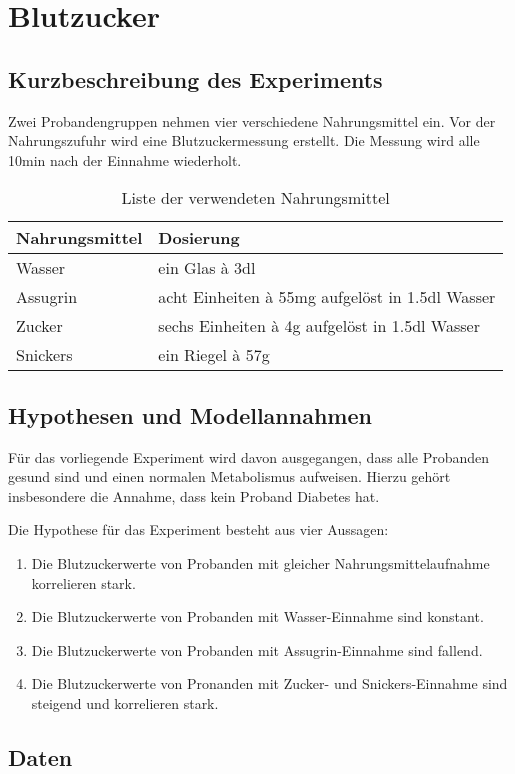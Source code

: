 \section{Blutzucker}

\subsection{Kurzbeschreibung des Experiments}
Zwei Probandengruppen nehmen vier verschiedene Nahrungsmittel ein.
Vor der Nahrungszufuhr wird eine Blutzuckermessung erstellt. Die Messung
wird alle 10min nach der Einnahme wiederholt. 
\begin{table}[h!]
	\centering
	\begin{tabular}{l l}
		Nahrungsmittel & Dosierung \\
		\hline
		Wasser & ein Glas à 3dl \\
		Assugrin & acht Einheiten à 55mg aufgelöst in 1.5dl Wasser \\
		Zucker & sechs Einheiten à 4g aufgelöst in 1.5dl Wasser \\
		Snickers & ein Riegel à 57g
	\end{tabular}
	\caption{Liste der verwendeten Nahrungsmittel}
\end{table}

\subsection{Hypothesen und Modellannahmen}
Für das vorliegende Experiment wird davon ausgegangen, dass alle Probanden
gesund sind und einen normalen Metabolismus aufweisen. Hierzu gehört
insbesondere die Annahme, dass kein Proband Diabetes hat.

Die Hypothese für das Experiment besteht aus vier Aussagen:
\begin{enumerate}[label=(\alph*)]
	\item Die Blutzuckerwerte von Probanden mit gleicher
		Nahrungsmittelaufnahme korrelieren stark.
	\item Die Blutzuckerwerte von Probanden mit Wasser-Einnahme sind
		konstant.
	\item Die Blutzuckerwerte von Probanden mit Assugrin-Einnahme
		sind fallend.
	\item Die Blutzuckerwerte von Pronanden mit Zucker- und
		Snickers-Einnahme sind steigend und korrelieren stark.
\end{enumerate}

\subsection{Daten}

